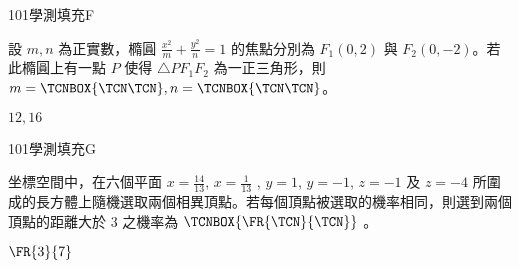     \begin{QUESTION}
        \begin{ExamInfo}{101}{學測}{填充}{F}
        \end{ExamInfo}
        \begin{ExamAnsRateInfo}{40}{80}{37}{3}
        \end{ExamAnsRateInfo}
        \begin{QBODY}
            設 $m,n$ 為正實數，橢圓 $\frac{x^2}{m}  + \frac{y^2}{n} =1$ 的焦點分別為 $F_1 (0,2)$ 與 $F_2 (0,-2)$。若此橢圓上有一點 $P$ 使得 $\triangle PF_1 F_2$ 為一正三角形，則 $m=\TCNBOX{\TCN\TCN} , n = \TCNBOX{\TCN\TCN}$。
        \end{QBODY}
        \begin{QFROMS}
        \end{QFROMS}
        \begin{QTAGS}\end{QTAGS}
        \begin{QANS}
            $12, 16$
        \end{QANS}
        \begin{QSOLLIST}
        \end{QSOLLIST}
        \begin{QEMPTYSPACE}
        \end{QEMPTYSPACE}
    \end{QUESTION}
    \begin{QUESTION}
        \begin{ExamInfo}{101}{學測}{填充}{G}
        \end{ExamInfo}
        \begin{ExamAnsRateInfo}{23}{54}{13}{2}
        \end{ExamAnsRateInfo}
        \begin{QBODY}
            坐標空間中，在六個平面 $x=\frac{14}{13}$,  $x=\frac{1}{13}$ , $y=1$,  $y=-1$, $z=-1$ 及 $z=-4$ 所圍成的長方體上隨機選取兩個相異頂點。若每個頂點被選取的機率相同，則選到兩個頂點的距離大於 3 之機率為 $\TCNBOX{\FR{\TCN}{\TCN}}$ 。
        \end{QBODY}
        \begin{QFROMS}
        \end{QFROMS}
        \begin{QTAGS}\end{QTAGS}
        \begin{QANS}
            $\FR{3}{7}$
        \end{QANS}
        \begin{QSOLLIST}
        \end{QSOLLIST}
        \begin{QEMPTYSPACE}
        \end{QEMPTYSPACE}
    \end{QUESTION}
